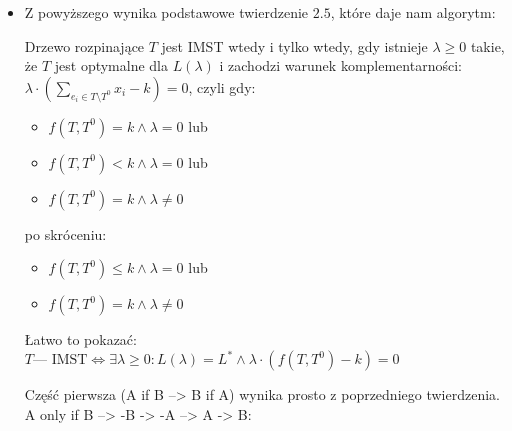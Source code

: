 \begin{itemize}
	\item Z powyższego wynika podstawowe twierdzenie $2.5$, które daje nam algorytm:
	
	Drzewo rozpinające $T$ jest IMST wtedy i tylko wtedy, gdy istnieje $\lambda \geqslant 0$ takie, że $T$ jest optymalne dla $L \left( \lambda \right)$ i zachodzi warunek komplementarności: $\lambda \cdot \left( \sum_{e_{i} \in T \setminus T^{0}} x_{i} - k \right) = 0$, czyli gdy:
	\begin{itemize}
		\item $f \left( T, T^{0} \right) = k \wedge \lambda = 0$ lub
		\item $f \left( T, T^{0} \right) < k \wedge \lambda = 0$ lub
		\item $f \left( T, T^{0} \right) = k \wedge \lambda \neq 0$
	\end{itemize}
	
	po skróceniu:
	
	\begin{itemize}
		\item $f \left( T, T^{0} \right) \leqslant k \wedge \lambda = 0$ lub
		\item $f \left( T, T^{0} \right) = k \wedge \lambda \neq 0$
	\end{itemize}
	
	Łatwo to pokazać: $T \text{--- IMST} \iff \exists \lambda \geqslant 0 : L \left( \lambda \right) = L^{*} \wedge \lambda \cdot \left( f \left( T, T^{0} \right) - k \right) = 0$
	
	Część pierwsza (A if B --> B if A) wynika prosto z poprzedniego twierdzenia. A only if B --> -B -> -A --> A -> B:
	

\end{itemize}
